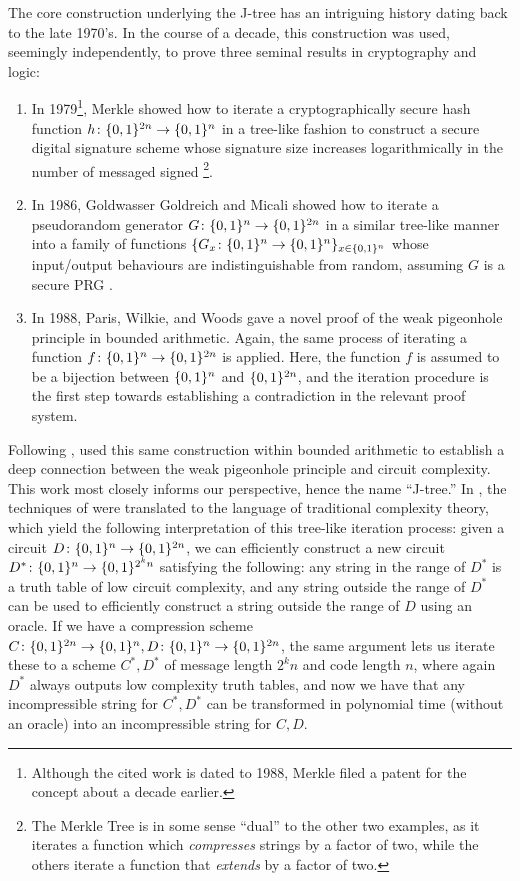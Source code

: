 The core construction underlying the J-tree has an intriguing history dating back to the late 1970's. In the course of a decade, this construction was used, seemingly independently, to prove three seminal results in cryptography and logic: 
\begin{enumerate}
    \item In 1979\footnote{Although the cited work is dated to 1988, Merkle filed a patent for the concept about a decade earlier.}, Merkle showed how to iterate a cryptographically secure hash function $h\colon \{0,1\}^{2n} \rightarrow \{0,1\}^n$ in a tree-like fashion to construct a secure digital signature scheme whose signature size increases logarithmically in the number of messaged signed \cite{Merkle}\footnote{The Merkle Tree is in some sense ``dual'' to the other two examples, as it iterates a function which \emph{compresses} strings by a factor of two, while the others iterate a function that \emph{extends} by a factor of two.}.
    \item In 1986, Goldwasser Goldreich and Micali showed how to iterate a pseudorandom generator $G\colon \{0,1\}^n \rightarrow \{0,1\}^{2n}$ in a similar tree-like manner into a family of functions $\{G_x\colon \{0,1\}^n \rightarrow \{0,1\}^n\}_{x \in \{0,1\}^n}$ whose input/output behaviours are indistinguishable from random, assuming $G$ is a secure PRG \cite{GGM}.
    \item In 1988, Paris, Wilkie, and Woods gave a novel proof of the weak pigeonhole principle in bounded arithmetic\cite{Paris-Wilkie-Woods}. Again, the same process of iterating a function $f\colon \{0,1\}^n \rightarrow \{0,1\}^{2n}$ is applied. Here, the function $f$ is assumed to be a bijection between $\{0,1\}^n$ and $\{0,1\}^{2n}$, and the iteration procedure is the first step towards establishing a contradiction in the relevant proof system.
\end{enumerate}

Following \cite{Paris-Wilkie-Woods}, \Jer \cite{Jerabek} used this same construction within bounded arithmetic to establish a deep connection between the weak pigeonhole principle and circuit complexity. This work most closely informs our perspective, hence the name ``J-tree.'' In \cite{Korten}, the techniques of \Jer were translated to the language of traditional complexity theory, which yield the following interpretation of this tree-like iteration process: given a circuit $D\colon \{0,1\}^n \rightarrow \{0,1\}^{2n}$, we can efficiently construct a new circuit $D^*\colon \{0,1\}^n \rightarrow \{0,1\}^{2^k n}$ satisfying the following: any string in the range of $D^*$ is a truth table of low circuit complexity, and any string outside the range of $D^*$ can be used to efficiently construct a string outside the range of $D$ using an  oracle. If we have a compression scheme $C\colon\{0,1\}^{2n}\rightarrow \{0,1\}^n, D\colon\{0,1\}^n\rightarrow \{0,1\}^{2n}$, the same argument lets us iterate these to a scheme $C^*,D^*$ of message length $2^kn$ and code length $n$, where again $D^*$ always outputs low complexity truth tables, and now we have that any incompressible string for $C^*,D^*$ can be transformed in polynomial time (without an oracle) into an incompressible string for $C,D$.

